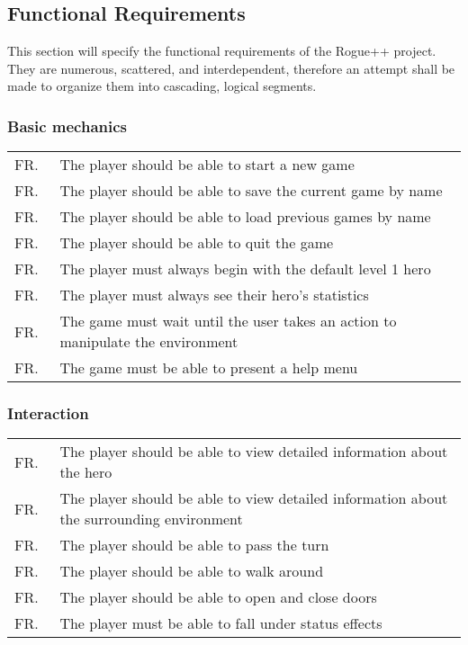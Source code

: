\documentclass[12pt, titlepage]{article}
\newcounter{FRCounter}
\newcommand{\freq}[1]{
	\hfill\stepcounter{FRCounter}FR.\textbf{\theFRCounter}
	& #1
}
\begin{document}
	\subsection{Functional Requirements}

	This section will specify the functional requirements of the Rogue++ project. They are numerous, scattered, and interdependent, therefore an attempt shall be made to organize them into cascading, logical segments.

		\subsubsection{Basic mechanics}
			\begin{tabular}{p{0.1\linewidth}p{0.9\linewidth}}
				\freq{The player should be able to start a new game}\\
				\freq{The player should be able to save the current game by name}\\
				\freq{The player should be able to load previous games by name}\\
				\freq{The player should be able to quit the game}\\
				\freq{The player must always begin with the default level 1 hero}\\
				\freq{The player must always see their hero's statistics}\\
				\freq{The game must wait until the user takes an action to manipulate the environment}\\
				\freq{The game must be able to present a help menu}\\
			\end{tabular}

		\subsubsection{Interaction}
			\begin{tabular}{p{0.1\linewidth}p{0.9\linewidth}}
				\freq{The player should be able to view detailed information about the hero}\\
				\freq{The player should be able to view detailed information about the surrounding environment}\\
				\freq{The player should be able to pass the turn}\\
				\freq{The player should be able to walk around}\\
				\freq{The player should be able to open and close doors}\\
				\freq{The player must be able to fall under status effects}\\
			\end{tabular}
\end{document}
